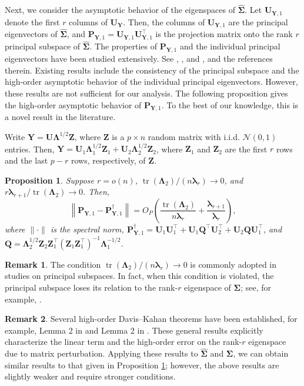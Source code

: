 \documentclass[12pt]{article} %
\DeclareMathOperator{\mytr}{tr}
\newcommand{\bQ}{\mathbf{Q}}
\newcommand{\bZ}{\mathbf{Z}}
\newcommand{\bP}{\mathbf{P}}
\newcommand{\bY}{\mathbf{Y}}
\newcommand{\bU}{\mathbf{U}}
\newcommand{\bfsym}[1]{\ensuremath{\boldsymbol{#1}}}
\def\blambda {\bfsym {\lambda}}
\def\bLambda {\bfsym {\Lambda}}
\def\bSigma {\bfsym {\Sigma}}
\newtheorem{proposition}{Proposition}
\theoremstyle{definition}
\newtheorem{remark}{Remark}
\begin{document}
Next, we consider the asymptotic behavior of the eigenspaces of $\hat{\bSigma}$.
Let $\bU_{\bY,1}$ denote the first $r$ columns of $\bU_{\bY}$.
Then, the columns of $\bU_{\bY,1}$ are the principal eigenvectors of $\hat{\bSigma}$, and $\bP_{\bY,1}=\bU_{\bY,1}\bU_{\bY,1}^\top$ is the projection matrix onto the rank $r$ principal subspace of $\hat{\bSigma}$.
The properties of $\bP_{\bY,1}$ and the individual principal eigenvectors have been studied extensively.
See \cite{Cai2015Optimal}, \cite{Shen2016A}, and \cite{wang2017As}, and the references therein.
Existing results include the consistency of the principal subspace and the high-order asymptotic behavior of the individual principal eigenvectors.
However, these results are not sufficient for our analysis.
The following proposition gives the high-order asymptotic behavior of $\bP_{\bY,1}$.
To the best of our knowledge, this is a novel result in the literature.



Write $\bY=\bU\bLambda^{1/2}\bZ$, where $\bZ$ is a $p\times n$ random matrix with i.i.d. $\mathcal{N}(0,1)$ entries.
Then, $\bY=\bU_1 \bLambda_1^{1/2} \bZ_1 +\bU_2 \bLambda_2^{1/2} \bZ_2$, where $\bZ_1$ and $\bZ_2$ are the first $r$ rows and the last $p-r$ rows, respectively, of $\bZ$.



\begin{proposition}\label{newEigenvectorPropCor}
    Suppose $r=o(n)$, $\mytr(\bLambda_2)/(n\blambda_r)\to 0$, and $r \blambda_{r+1}/\mytr(\bLambda_2)\to 0$.
    Then,
    \begin{equation*}
        \left\|\bP_{\bY,1} - 
        \bP_{\bY,1}^{\dagger}\right\|
        =O_P\left(\frac{\mytr(\bLambda_2)}{n\blambda_r}+\frac{\blambda_{r+1}}{\blambda_r}\right),
    \end{equation*}
where
$\|\cdot\|$ is the spectral norm,
$
\bP_{\bY,1}^{\dagger}
=\bU_1 \bU_1^\top + \bU_1 \bQ^\top \bU_2^\top
            +\bU_2 \bQ \bU_1^\top
            $, and 
$\bQ
       =
       \bLambda_2^{1/2} \bZ_2 \bZ_1^\top (\bZ_1 \bZ_1^\top)^{-1} \bLambda_1^{-1/2}
       $.
\end{proposition}
\begin{remark}
    The condition $\mytr(\bLambda_2)/(n\blambda_r)\to 0$ is commonly adopted in studies on principal subspaces.
    In fact, when this condition is violated, the principal subspace loses its relation to the rank-$r$ eigenspace of $\bSigma$; see, for example, \cite{Nadler2009Finite}.
\end{remark}
\begin{remark}
    Several high-order Davis--Kahan theorems have been established, for example, Lemma 2 in \cite{koltchinskii2016} and Lemma 2 in \cite{fan2017Dist}.
    These general results explicitly characterize the linear term and the high-order error on the rank-$r$ eigenspace due to matrix perturbation.
    Applying these results to $\hat{\bSigma}$ and $\bSigma$, we can obtain similar results to that given in Proposition \ref{newEigenvectorPropCor};
    however, the above results are slightly weaker and require stronger conditions. 
\end{remark}
\end{document}
